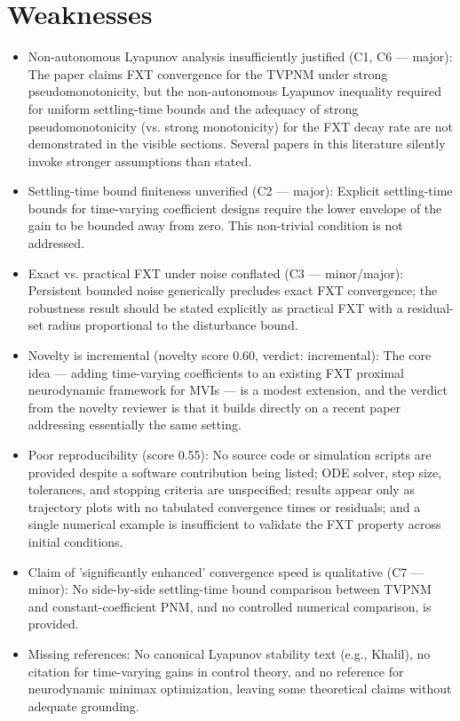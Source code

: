 \documentclass[11pt]{article}
\begin{document}
\section*{Weaknesses}
\begin{itemize}[leftmargin=*]
  \item Non-autonomous Lyapunov analysis insufficiently justified (C1, C6 — major): The paper claims FXT convergence for the TVPNM under strong pseudomonotonicity, but the non-autonomous Lyapunov inequality required for uniform settling-time bounds and the adequacy of strong pseudomonotonicity (vs. strong monotonicity) for the FXT decay rate are not demonstrated in the visible sections. Several papers in this literature silently invoke stronger assumptions than stated.
  \item Settling-time bound finiteness unverified (C2 — major): Explicit settling-time bounds for time-varying coefficient designs require the lower envelope of the gain to be bounded away from zero. This non-trivial condition is not addressed.
  \item Exact vs. practical FXT under noise conflated (C3 — minor/major): Persistent bounded noise generically precludes exact FXT convergence; the robustness result should be stated explicitly as practical FXT with a residual-set radius proportional to the disturbance bound.
  \item Novelty is incremental (novelty score 0.60, verdict: incremental): The core idea — adding time-varying coefficients to an existing FXT proximal neurodynamic framework for MVIs — is a modest extension, and the verdict from the novelty reviewer is that it builds directly on a recent paper addressing essentially the same setting.
  \item Poor reproducibility (score 0.55): No source code or simulation scripts are provided despite a software contribution being listed; ODE solver, step size, tolerances, and stopping criteria are unspecified; results appear only as trajectory plots with no tabulated convergence times or residuals; and a single numerical example is insufficient to validate the FXT property across initial conditions.
  \item Claim of 'significantly enhanced' convergence speed is qualitative (C7 — minor): No side-by-side settling-time bound comparison between TVPNM and constant-coefficient PNM, and no controlled numerical comparison, is provided.
  \item Missing references: No canonical Lyapunov stability text (e.g., Khalil), no citation for time-varying gains in control theory, and no reference for neurodynamic minimax optimization, leaving some theoretical claims without adequate grounding.
\end{itemize}
\end{document}
